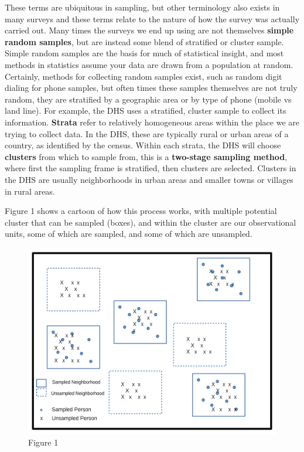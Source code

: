 \documentclass[
  letterpaper,
  DIV=11,
  numbers=noendperiod]{scrreprt}
\begin{document}
These terms are ubiquitous in sampling, but other terminology also
exists in many surveys and these terms relate to the nature of how the
survey was actually carried out. Many times the surveys we end up using
are not themselves \textbf{simple random samples}, but are instead some
blend of stratified or cluster sample. Simple random samples are the
basis for much of statistical insight, and most methods in statistics
assume your data are drawn from a population at random. Certainly,
methods for collecting random samples exist, such as random digit
dialing for phone samples, but often times these samples themselves are
not truly random, they are stratified by a geographic area or by type of
phone (mobile vs land line). For example, the DHS uses a stratified,
cluster sample to collect its information. \textbf{Strata} refer to
relatively homogeneous areas within the place we are trying to collect
data. In the DHS, these are typically rural or urban areas of a country,
as identified by the census. Within each strata, the DHS will choose
\textbf{clusters} from which to sample from, this is a \textbf{two-stage
sampling method}, where first the sampling frame is stratified, then
clusters are selected. Clusters in the DHS are usually neighborhoods in
urban areas and smaller towns or villages in rural areas.

Figure 1 shows a cartoon of how this process works, with multiple
potential cluster that can be sampled (boxes), and within the cluster
are our observational units, some of which are sampled, and some of
which are unsampled.

\begin{figure}

{\centering \includegraphics{images/MLdata.png}

}

\caption{Figure 1}

\end{figure}
\end{document}
